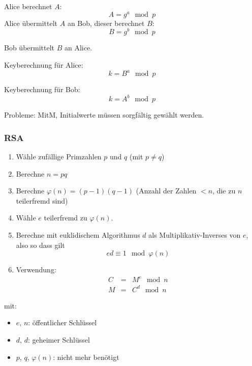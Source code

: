 Alice berechnet $A$:
\begin{equation*}
    A = g^a \mod p
\end{equation*}
Alice übermittelt $A$ an Bob, dieser berechnet $B$:
\begin{equation*}
    B = g^b \mod p
\end{equation*}

Bob übermittelt $B$ an Alice.

Keyberechnung für Alice:
\begin{equation*}
    k = B^a \mod p
\end{equation*}

Keyberechnung für Bob:
\begin{equation*}
    k = A^b \mod p
\end{equation*}

Probleme: MitM, Initialwerte müssen sorgfältig gewählt werden.

\subsubsection{RSA}
\begin{enumerate}
    \item Wähle zufällige Primzahlen $p$ und $q$ (mit $p \neq q$)
    \item Berechne $n = pq$
    \item Berechne $\varphi(n) = (p-1)(q-1)$ (Anzahl der Zahlen $<n$, die zu $n$ teilerfremd sind)
    \item Wähle $e$ teilerfremd zu $\varphi(n)$.
    \item Berechne mit euklidischem Algorithmus $d$ als Multiplikativ-Inverses von $e$, also so dass gilt
        \begin{equation*}
            e d \equiv 1 \mod \varphi(n)
        \end{equation*}
    \item Verwendung:
        \begin{eqnarray*}
            C &=& M^e \mod n \\
            M &=& C^d \mod n
        \end{eqnarray*}
\end{enumerate}
mit:
\begin{itemize}
    \item $e$, $n$: öffentlicher Schlüssel
    \item $d$, $d$: geheimer Schlüssel
    \item $p$, $q$, $\varphi(n)$: nicht mehr benötigt
\end{itemize}

